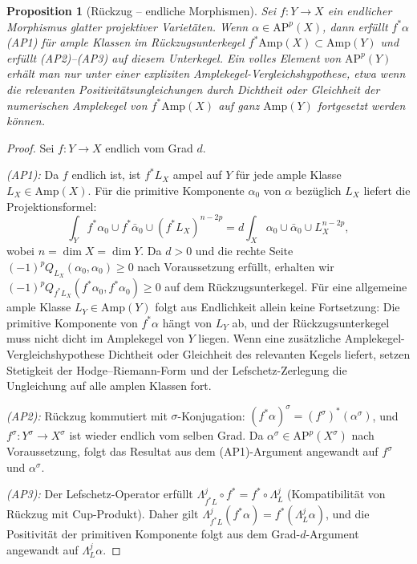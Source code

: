 \documentclass[aps,prd,twocolumn,superscriptaddress,nofootinbib]{revtex4-2}
\newtheorem{proposition}[theorem]{Proposition}
\theoremstyle{definition}
\theoremstyle{remark}
\begin{document}
\begin{proposition}[Rückzug -- endliche Morphismen]
\label{prop:pullback}
Sei $f: Y \to X$ ein endlicher Morphismus glatter projektiver Varietäten. Wenn $\alpha \in \mathrm{AP}^p(X)$, dann erfüllt $f^*\alpha$ (AP1) für ample Klassen im Rückzugsunterkegel $f^*\mathrm{Amp}(X) \subset \mathrm{Amp}(Y)$ und erfüllt (AP2)--(AP3) auf diesem Unterkegel. Ein volles Element von $\mathrm{AP}^p(Y)$ erhält man nur unter einer expliziten Amplekegel-Vergleichshypothese, etwa wenn die relevanten Positivitätsungleichungen durch Dichtheit oder Gleichheit der numerischen Amplekegel von $f^*\mathrm{Amp}(X)$ auf ganz $\mathrm{Amp}(Y)$ fortgesetzt werden können.
\end{proposition}

\begin{proof}
Sei $f: Y \to X$ endlich vom Grad $d$.

\textit{(AP1):} Da $f$ endlich ist, ist $f^*L_X$ ampel auf $Y$ für jede ample Klasse $L_X \in \mathrm{Amp}(X)$. Für die primitive Komponente $\alpha_0$ von $\alpha$ bezüglich $L_X$ liefert die Projektionsformel:
\[
\int_Y f^*\alpha_0 \cup f^*\bar{\alpha}_0 \cup (f^*L_X)^{n-2p} = d \int_X \alpha_0 \cup \bar{\alpha}_0 \cup L_X^{n-2p},
\]
wobei $n = \dim X = \dim Y$. Da $d > 0$ und die rechte Seite $(-1)^p Q_{L_X}(\alpha_0, \alpha_0) \geq 0$ nach Voraussetzung erfüllt, erhalten wir $(-1)^p Q_{f^*L_X}(f^*\alpha_0, f^*\alpha_0) \geq 0$ auf dem Rückzugsunterkegel. Für eine allgemeine ample Klasse $L_Y \in \mathrm{Amp}(Y)$ folgt aus Endlichkeit allein keine Fortsetzung: Die primitive Komponente von $f^*\alpha$ hängt von $L_Y$ ab, und der Rückzugsunterkegel muss nicht dicht im Amplekegel von $Y$ liegen. Wenn eine zusätzliche Amplekegel-Vergleichshypothese Dichtheit oder Gleichheit des relevanten Kegels liefert, setzen Stetigkeit der Hodge--Riemann-Form und der Lefschetz-Zerlegung die Ungleichung auf alle amplen Klassen fort.

\textit{(AP2):} Rückzug kommutiert mit $\sigma$-Konjugation: $(f^*\alpha)^\sigma = (f^\sigma)^*(\alpha^\sigma)$, und $f^\sigma: Y^\sigma \to X^\sigma$ ist wieder endlich vom selben Grad. Da $\alpha^\sigma \in \mathrm{AP}^p(X^\sigma)$ nach Voraussetzung, folgt das Resultat aus dem (AP1)-Argument angewandt auf $f^\sigma$ und $\alpha^\sigma$.

\textit{(AP3):} Der Lefschetz-Operator erfüllt $\Lambda_{f^*L}^j \circ f^* = f^* \circ \Lambda_L^j$ (Kompatibilität von Rückzug mit Cup-Produkt). Daher gilt $\Lambda_{f^*L}^j(f^*\alpha) = f^*(\Lambda_L^j \alpha)$, und die Positivität der primitiven Komponente folgt aus dem Grad-$d$-Argument angewandt auf $\Lambda_L^j\alpha$.
\end{proof}
\end{document}
